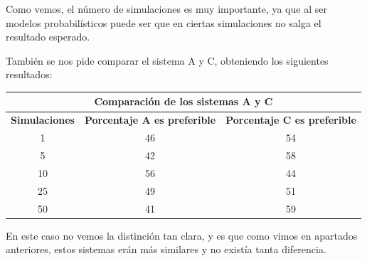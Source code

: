 \documentclass[12pt, spanish]{article}
\begin{document}
Como vemos, el número de simulaciones es muy importante, ya que al ser modelos probabilísticos puede ser que en ciertas simulaciones no salga el resultado esperado.


También se nos pide comparar el sistema A y C, obteniendo los siguientes resultados:

\begin{table}[H]
\centering
\begin{tabular}{|c|c|c|}
\hline
\multicolumn{3}{|c|}{\textbf{Comparación de los sistemas A y C}}                                  \\ \hline
\textbf{Simulaciones} & \textbf{Porcentaje A es preferible} & \textbf{Porcentaje C es preferible} \\ \hline
1                     & 46                                  & 54                                  \\ \hline
5                     & 42                                  & 58                                  \\ \hline
10                    & 56                                  & 44                                  \\ \hline
25                    & 49                                  & 51                                  \\ \hline
50                    & 41                                  & 59                                  \\ \hline
\end{tabular}
\end{table}

En este caso no vemos la distinción tan clara, y es que como vimos en apartados anteriores, estos sistemas erán más similares y no existía tanta diferencia.

%
%
\end{document}
